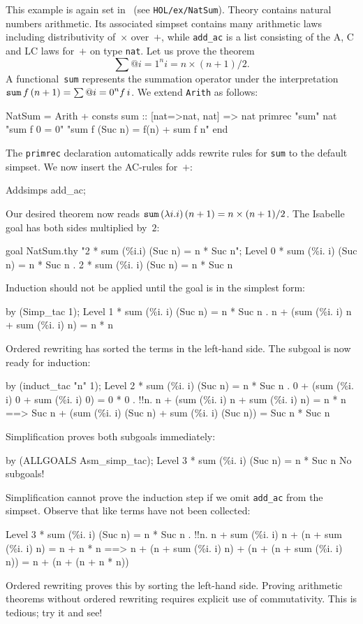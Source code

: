 This example is again set in \HOL\ (see \texttt{HOL/ex/NatSum}).
Theory  contains natural numbers arithmetic.  Its
associated simpset contains many arithmetic laws including
distributivity of~$\times$ over~$+$, while {\tt add_ac} is a list
consisting of the A, C and LC laws for~$+$ on type \texttt{nat}.  Let
us prove the theorem
\[ \sum@{i=1}^n i = n\times(n+1)/2. \]
%
A functional~{\tt sum} represents the summation operator under the
interpretation ${\tt sum} \, f \, (n + 1) = \sum@{i=0}^n f\,i$.  We
extend {\tt Arith} as follows:
\begin{ttbox}
NatSum = Arith +
consts sum     :: [nat=>nat, nat] => nat
primrec "sum" nat 
  "sum f 0 = 0"
  "sum f (Suc n) = f(n) + sum f n"
end
\end{ttbox}
The \texttt{primrec} declaration automatically adds rewrite rules for
\texttt{sum} to the default simpset.  We now insert the AC-rules for~$+$:
\begin{ttbox}
Addsimps add_ac;
\end{ttbox}
Our desired theorem now reads ${\tt sum} \, (\lambda i.i) \, (n+1) =
n\times(n+1)/2$.  The Isabelle goal has both sides multiplied by~$2$:
\begin{ttbox}
goal NatSum.thy "2 * sum (\%i.i) (Suc n) = n * Suc n";
{\out Level 0}
{ * sum (\%i. i) (Suc n) = n * Suc n}
{. 2 * sum (\%i. i) (Suc n) = n * Suc n}
\end{ttbox}
Induction should not be applied until the goal is in the simplest
form:
\begin{ttbox}
by (Simp_tac 1);
{\out Level 1}
{ * sum (\%i. i) (Suc n) = n * Suc n}
{. n + (sum (\%i. i) n + sum (\%i. i) n) = n * n}
\end{ttbox}
Ordered rewriting has sorted the terms in the left-hand side.  The
subgoal is now ready for induction:
\begin{ttbox}
by (induct_tac "n" 1);
{\out Level 2}
{ * sum (\%i. i) (Suc n) = n * Suc n}
{. 0 + (sum (\%i. i) 0 + sum (\%i. i) 0) = 0 * 0}
\ttbreak
{. !!n. n + (sum (\%i. i) n + sum (\%i. i) n) = n * n}
{\out           ==> Suc n + (sum (\%i. i) (Suc n) + sum (\%i. i) (Suc n)) =}
{\out               Suc n * Suc n}
\end{ttbox}
Simplification proves both subgoals immediately:
\begin{ttbox}
by (ALLGOALS Asm_simp_tac);
{\out Level 3}
{ * sum (\%i. i) (Suc n) = n * Suc n}
{\out No subgoals!}
\end{ttbox}
Simplification cannot prove the induction step if we omit {\tt add_ac} from
the simpset.  Observe that like terms have not been collected:
\begin{ttbox}
{\out Level 3}
{ * sum (\%i. i) (Suc n) = n * Suc n}
{. !!n. n + sum (\%i. i) n + (n + sum (\%i. i) n) = n + n * n}
{\out           ==> n + (n + sum (\%i. i) n) + (n + (n + sum (\%i. i) n)) =}
{\out               n + (n + (n + n * n))}
\end{ttbox}
Ordered rewriting proves this by sorting the left-hand side.  Proving
arithmetic theorems without ordered rewriting requires explicit use of
commutativity.  This is tedious; try it and see!

